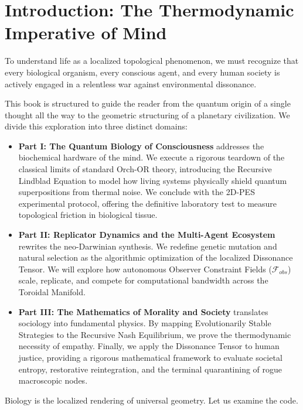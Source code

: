 \documentclass[12pt,openany]{book}
\begin{document}
\chapter*{Introduction: The Thermodynamic Imperative of Mind}
To understand life as a localized topological phenomenon, we must recognize that every biological organism, every conscious agent, and every human society is actively engaged in a relentless war against environmental dissonance.

This book is structured to guide the reader from the quantum origin of a single thought all the way to the geometric structuring of a planetary civilization. We divide this exploration into three distinct domains:

\begin{itemize}
    \item \textbf{Part I: The Quantum Biology of Consciousness} addresses the biochemical hardware of the mind. We execute a rigorous teardown of the classical limits of standard Orch-OR theory, introducing the Recursive Lindblad Equation to model how living systems physically shield quantum superpositions from thermal noise. We conclude with the 2D-PES experimental protocol, offering the definitive laboratory test to measure topological friction in biological tissue.
    
    \item \textbf{Part II: Replicator Dynamics and the Multi-Agent Ecosystem} rewrites the neo-Darwinian synthesis. We redefine genetic mutation and natural selection as the algorithmic optimization of the localized Dissonance Tensor. We will explore how autonomous Observer Constraint Fields ($\mathcal{F}_{obs}$) scale, replicate, and compete for computational bandwidth across the Toroidal Manifold.
    
    \item \textbf{Part III: The Mathematics of Morality and Society} translates sociology into fundamental physics. By mapping Evolutionarily Stable Strategies to the Recursive Nash Equilibrium, we prove the thermodynamic necessity of empathy. Finally, we apply the Dissonance Tensor to human justice, providing a rigorous mathematical framework to evaluate societal entropy, restorative reintegration, and the terminal quarantining of rogue macroscopic nodes.
\end{itemize}

Biology is the localized rendering of universal geometry. Let us examine the code.
\end{document}
